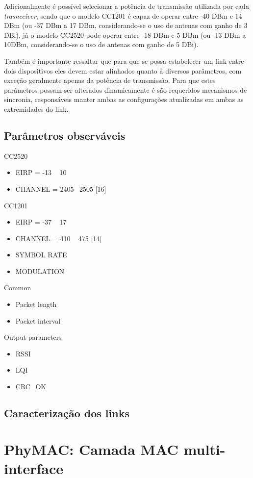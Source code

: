 \documentclass[
	12pt,				%
	openright,			%
	oneside,
	a4paper,			%
	english,			%
	french,				%
	spanish,			%
	brazil				%
	]{abntex2}
\begin{document}
	Adicionalmente é possível selecionar a potência de transmissão utilizada por cada \textit{trasnceiver}, sendo que o modelo CC1201 é capaz de operar entre -40 DBm e 14 DBm (ou -37 DBm a 17 DBm, considerando-se o uso de antenas com ganho de 3 DBi), já o modelo CC2520 pode operar entre -18 DBm e 5 DBm (ou -13 DBm a 10DBm, considerando-se o uso de antenas com ganho de 5 DBi).
	
	Também é importante ressaltar que para que se possa estabelecer um link entre dois dispositivos eles devem estar alinhados quanto à diversos parâmetros, com exceção geralmente apenas da potência de transmissão. Para que estes parâmetros possam ser alterados dinamicamente é são requeridos mecanismos de sincronia, responsáveis manter ambas as configurações atualizadas em ambas as extremidades do link.
	\section{Parâmetros observáveis}
	CC2520
	\begin{itemize}
		\item EIRP = -13 ~ 10
		\item CHANNEL = 2405 ~2505 [16]
	\end{itemize}
	CC1201
	\begin{itemize}
		\item EIRP = -37 ~ 17
		\item CHANNEL = 410 ~ 475 [14]
		\item SYMBOL RATE
		\item MODULATION
	\end{itemize}
	Common
	\begin{itemize}
		\item Packet length
		\item Packet interval
	\end{itemize}
	Output parameters
	\begin{itemize}
		\item RSSI
		\item LQI
		\item CRC\_OK
	\end{itemize}
\section{Caracterização dos links}

\chapter{PhyMAC: Camada MAC multi-interface} \label{phymac}
\end{document}

